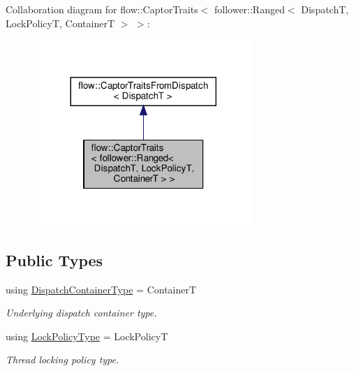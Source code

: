 Collaboration diagram for flow\+:\+:Captor\+Traits$<$ follower\+:\+:Ranged$<$ DispatchT, Lock\+PolicyT, ContainerT $>$ $>$\+:\nopagebreak
\begin{figure}[H]
\begin{center}
\leavevmode
\includegraphics[width=236pt]{structflow_1_1_captor_traits_3_01follower_1_1_ranged_3_01_dispatch_t_00_01_lock_policy_t_00_01_c8938fb851c68c18c6b678c859df867e4}
\end{center}
\end{figure}
\subsection*{Public Types}
\begin{DoxyCompactItemize}
\item 
\mbox{\label{structflow_1_1_captor_traits_3_01follower_1_1_ranged_3_01_dispatch_t_00_01_lock_policy_t_00_01_container_t_01_4_01_4_abfc1dfc2cb82a557d3da71efe2fbae36}} 
using \hyperlink{structflow_1_1_captor_traits_3_01follower_1_1_ranged_3_01_dispatch_t_00_01_lock_policy_t_00_01_container_t_01_4_01_4_abfc1dfc2cb82a557d3da71efe2fbae36}{Dispatch\+Container\+Type} = ContainerT
\begin{DoxyCompactList}\small\item\em Underlying dispatch container type. \end{DoxyCompactList}\item 
\mbox{\label{structflow_1_1_captor_traits_3_01follower_1_1_ranged_3_01_dispatch_t_00_01_lock_policy_t_00_01_container_t_01_4_01_4_aee25c87c4cd32ded2ec65dd1a65d0ea2}} 
using \hyperlink{structflow_1_1_captor_traits_3_01follower_1_1_ranged_3_01_dispatch_t_00_01_lock_policy_t_00_01_container_t_01_4_01_4_aee25c87c4cd32ded2ec65dd1a65d0ea2}{Lock\+Policy\+Type} = Lock\+PolicyT
\begin{DoxyCompactList}\small\item\em Thread locking policy type. \end{DoxyCompactList}\end{DoxyCompactItemize}


